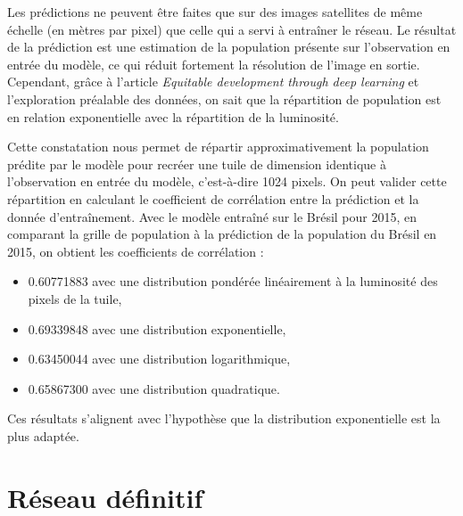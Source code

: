 \documentclass[a4paper, 11pt]{report}
\begin{document}
Les prédictions ne peuvent être faites que sur des images satellites de même échelle (en mètres par pixel) que celle qui a servi à entraîner le réseau. Le résultat de la prédiction est une estimation de la population présente sur l'observation en entrée du modèle, ce qui réduit fortement la résolution de l'image en sortie. Cependant, grâce à l'article \textit{Equitable development through deep learning} \cite{netpop-article} et l'exploration préalable des données, on sait que la répartition de population est en relation exponentielle avec la répartition de la luminosité.

Cette constatation nous permet de répartir approximativement la population prédite par le modèle pour recréer une tuile de dimension identique à l'observation en entrée du modèle, c'est-à-dire 1024 pixels. On peut valider cette répartition en calculant le coefficient de corrélation entre la prédiction et la donnée d'entraînement. Avec le modèle entraîné sur le Brésil pour 2015, en comparant la grille de population à la prédiction de la population du Brésil en 2015, on obtient les coefficients de corrélation :

\begin{itemize}
	\item 0.60771883 avec une distribution pondérée linéairement à la luminosité des pixels de la tuile,
	\item 0.69339848 avec une distribution exponentielle,
	\item 0.63450044 avec une distribution logarithmique,
	\item 0.65867300 avec une distribution quadratique.
\end{itemize}

Ces résultats s'alignent avec l'hypothèse que la distribution exponentielle est la plus adaptée.

\section{Réseau définitif}
\label{Réseaufinal}
\end{document}

